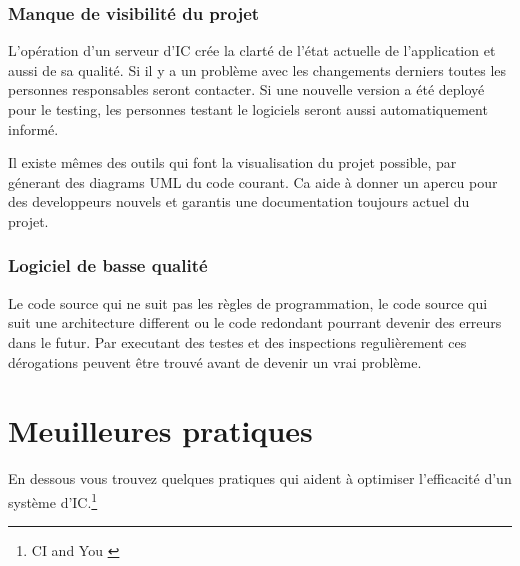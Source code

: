 \subsubsection{Manque de visibilité du projet}
L'opération d'un serveur d'IC crée la clarté de l'état actuelle de l'application et aussi de sa qualité. Si il y a un problème avec les changements derniers toutes les personnes responsables seront contacter. Si une nouvelle version a été deployé pour le testing, les personnes testant le logiciels seront aussi automatiquement informé.

Il existe mêmes des outils qui font la visualisation du projet possible, par génerant des diagrams UML du code courant. Ca aide à donner un apercu pour des developpeurs nouvels et garantis une documentation toujours actuel du projet.
\subsubsection{Logiciel de basse qualité }
Le code source qui ne suit pas les règles de programmation, le code source qui suit une architecture different ou le code redondant pourrant devenir des erreurs dans le futur.
Par executant des testes et des inspections regulièrement ces dérogations peuvent être trouvé avant de devenir un vrai problème.
\clearpage

\section{Meuilleures pratiques}
\label{sec:meuilleurespratiques}

En dessous vous trouvez quelques pratiques qui aident à optimiser l'efficacité d'un système d'IC.\footnote{CI and You \cite[p~47]{duvallconint}}

